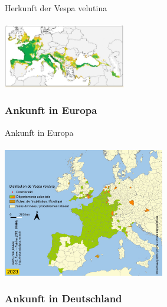 \documentclass[aspectratio=169]{beamer}
\begin{document}
\begin{frame}{Herkunft der Vespa velutina}
	\framesubtitle{} 

		\begin{center}	
			\includegraphics[width=0.4\textwidth]{figures/Herkunft_2.jpg}
		\end{center}
\end{frame}

\subsubsection[Ankunft in Europa]{Ankunft in Europa}

\begin{frame}{Ankunft in Europa}
	\framesubtitle{}

		\begin{center}	
			\includegraphics[width=0.53\textwidth]{figures/Progression_Invasion_Vespa_velutina-Q_Rome_MNHN2023b.jpg}
		\end{center}
\end{frame}

\subsubsection[Ankunft in Deutschland]{Ankunft in Deutschland}
\end{document}
